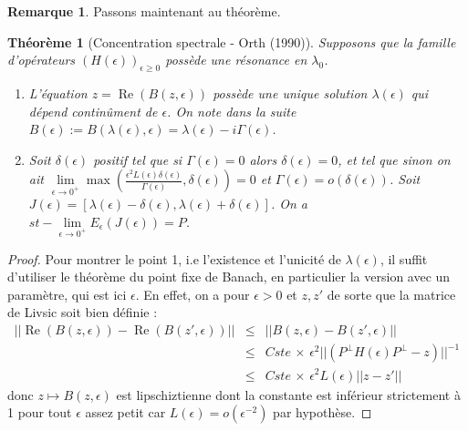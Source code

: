 \documentclass[12pt,openany,a4paper, titlepage]{article}
\newcommand{\f}[2]{\frac{#1}{#2}}
\newcommand{\lp}{\left(}
\newcommand{\rp}{\right)}
\newtheorem{theo}{Théorème}
\theoremstyle{definition}
\theoremstyle{definition}
\theoremstyle{definition}
\theoremstyle{definition}
\theoremstyle{definition}
\newtheorem{rem}{Remarque}
\theoremstyle{definition}
\begin{document}
\begin{rem}
Passons maintenant au théorème.
\begin{theo}[Concentration spectrale - Orth (1990)]\label{Orth}
    Supposons que la famille d'opérateurs $(H(\epsilon))_{\epsilon \geq 0}$ possède une résonance en $\lambda_0$. 
    \begin{enumerate}
        \item L'équation $z = \operatorname{Re}(B(z,\epsilon))$ possède une unique solution $\lambda(\epsilon)$ qui dépend continûment de $\epsilon$. On note dans la suite $B(\epsilon) := B(\lambda(\epsilon),\epsilon) = \lambda(\epsilon) - i\Gamma(\epsilon)$.
        \item Soit $\delta(\epsilon)$ positif tel que si $\Gamma(\epsilon) = 0$ alors $\delta(\epsilon) = 0$, et tel que sinon on ait
        $\lim\limits_{\epsilon\rightarrow 0^+}\max\lp \f{\epsilon^2L(\epsilon)\delta(\epsilon)}{\Gamma(\epsilon)}, \delta(\epsilon) \rp = 0$ et  $\Gamma(\epsilon) = o(\delta(\epsilon))$. Soit $J(\epsilon) = [\lambda(\epsilon) - \delta(\epsilon), \lambda(\epsilon) + \delta(\epsilon)]$. On a $st-\lim\limits_{\epsilon\rightarrow 0^+} E_{\epsilon}(J(\epsilon)) = P$.
    \end{enumerate}
\end{theo}

\begin{proof}
Pour montrer le point 1, i.e l'existence et l'unicité de $\lambda(\epsilon)$, il suffit d'utiliser le théorème du point fixe de Banach, en particulier la version avec un paramètre, qui est ici $\epsilon$. En effet, on a pour $\epsilon > 0$ et $z,z'$ de sorte que la matrice de Livsic soit bien définie :
\begin{eqnarray}
    ||\operatorname{Re}(B(z,\epsilon)) - \operatorname{Re}(B(z',\epsilon))|| &\leq& ||B(z,\epsilon) - B(z',\epsilon)|| \\
    &\leq& Cste \, \times \, \epsilon ^ 2 ||\lp P^\perp H(\epsilon) P^\perp - z \rp ||^{-1} \\
    &\leq& Cste \, \times \, \epsilon ^ 2 L(\epsilon) ||z - z'||
\end{eqnarray}
donc $z\mapsto B(z,\epsilon)$ est lipschiztienne dont la constante est inférieur strictement à 1 pour tout $\epsilon$ assez petit car $L(\epsilon) = o(\epsilon^{-2})$ par hypothèse.


\end{proof}
\end{rem}
\end{document}
